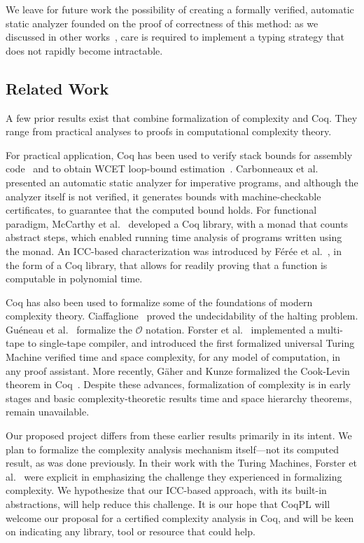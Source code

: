We leave for future work the possibility of creating a formally verified, automatic static analyzer founded on the proof of correctness of this method: as we discussed in other works~\cite{aubert2023b,aubert20222}, care is required to implement a typing strategy that does not rapidly become intractable.

\subsection{Related Work}\label{coqpl-related}

A few prior results exist that combine formalization of complexity and Coq.
They range from practical analyses to proofs in computational complexity theory.

For practical application, Coq has been used to verify stack bounds for assembly code~\cite{carbonneaux2014}
and to obtain WCET loop-bound estimation~\cite{blazy2013}.
Carbonneaux et al. ~\cite{carbonneaux2017} presented an automatic static analyzer for imperative programs, and although the analyzer itself is not verified, it generates bounds with machine-checkable certificates, to guarantee that the computed bound holds.
For functional paradigm, McCarthy et al.~\cite{mccarthy2018} developed a Coq library, with a monad that counts abstract steps, which enabled running time analysis of programs written using the monad.
An ICC-based characterization was introduced by F\'{e}r\'{e}e et al.~\cite{feree2018}, in the form of a
Coq library, that allows for readily proving that a function is computable in polynomial time. %

Coq has also been used to formalize some of the foundations of modern complexity theory.
Ciaffaglione~\cite{ciaffaglione2016} proved the undecidability of the halting problem.
Gu{\'e}neau et al.~\cite{gueneau2018} formalize the \(\mathcal{O}\) notation.
Forster et al.~\cite{forster2020} implemented a multi-tape to single-tape compiler, and
introduced the first formalized universal Turing Machine verified \wrt time and space complexity, for any model of computation, in any proof assistant.
More recently, G\"{a}her and Kunze formalized the Cook-Levin theorem in Coq~\cite{gaher2021}.
Despite these advances, formalization of complexity is in early stages and basic complexity-theoretic
results \eg time and space hierarchy theorems, remain unavailable.

Our proposed project differs from these earlier results primarily in its intent.
We plan to formalize the complexity analysis mechanism itself---not its computed result, as was done previously.
In their work with the Turing Machines, Forster et al.~\cite{forster2020} were explicit
in emphasizing the challenge they experienced in formalizing complexity.
We hypothesize that our ICC-based approach, with \eg its built-in abstractions, will help reduce this challenge.
It is our hope that CoqPL will welcome our proposal for a certified complexity analysis in Coq, and will be keen on indicating any library, tool or resource that could help.
